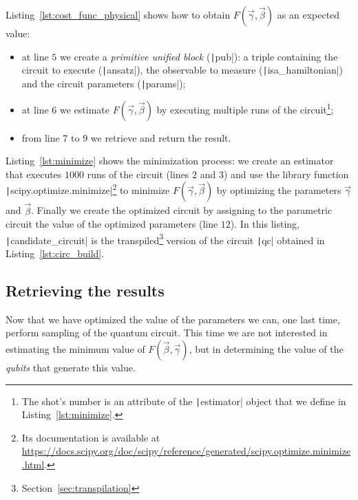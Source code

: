 \begin{listing}[h]
	\caption{$F(\vec{\gamma}, \vec{\beta})$ estimation}
	\label{lst:cost_func_physical}
\end{listing}

Listing~\ref{lst:cost_func_physical} shows how to obtain $F(\vec{\gamma}, \vec{\beta})$ as an expected value:
\begin{itemize}
	\item at line $5$ we create a \emph{primitive unified block} (\texttt|pub|): a triple containing the circuit to execute (\texttt|ansatz|), the observable to measure (\texttt|isa_hamiltonian|) and the circuit parameters (\texttt|params|);
	\item at line $6$ we estimate $F(\vec{\gamma}, \vec{\beta})$ by executing multiple runs of the circuit\footnote{The shot's number is an attribute of the \texttt|estimator| object that we define in Listing~\ref{lst:minimize}.};
	\item from line $7$ to $9$ we retrieve and return the result.
\end{itemize}

\begin{listing}[h]
	\caption{$\vec{\gamma}$ and $\vec{\beta}$ optimization}
	\label{lst:minimize}
\end{listing}

Listing~\ref{lst:minimize} shows the minimization process: we create an estimator that executes $1000$ runs of the circuit (lines $2$ and $3$) and use the library function \texttt|scipy.optimize.minimize|\footnote{Its documentation is available at \url{https://docs.scipy.org/doc/scipy/reference/generated/scipy.optimize.minimize.html}.} to minimize $F(\vec{\gamma}, \vec{\beta})$ by optimizing the parameters $\vec{\gamma}$ and $\vec{\beta}$. Finally we create the optimized circuit by assigning to the parametric circuit the value of the optimized parameters (line $12$). In this listing, \texttt|candidate_circuit| is the transpiled\footnote{Section~\ref{sec:transpilation}} version of the circuit \texttt|qc| obtained in Listing~\ref{lst:circ_build}.

\subsection{Retrieving the results}
Now that we have optimized the value of the parameters we can, one last time, perform sampling of the quantum circuit. This time we are not interested in estimating the minimum value of $F(\vec{\beta}, \vec{\gamma})$, but in determining the value of the \emph{qubits} that generate this value.

